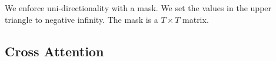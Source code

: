 \documentclass[11pt]{article}
\begin{document}
\begin{minipage}[l]{.5\linewidth}
    \begin{figure}[H]
        \centering
    \end{figure}
\end{minipage}\hfill
\begin{minipage}[r]{.47\linewidth}
    We enforce uni-directionality with a mask. We set the values in the upper triangle to negative infinity. The mask is a $T\times T$ matrix.
\end{minipage}

\subsection{Cross Attention}
\end{document}
